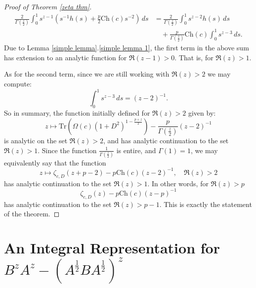\begin{proof}[Proof of Theorem \ref{zeta thm}]
\begin{align*}
            \frac{2}{\Gamma\left(\frac{z}{2}\right)}\int_0^1 s^{z-1}(s^{-1}h(s)+\frac{p}{2}\mathrm{Ch}(c)s^{-2})\,ds &= \frac{2}{\Gamma\left(\frac{z}{2}\right)} \int_0^1 s^{z-2}h(s)\,ds\\
                                                                                                             &\quad + \frac{p}{\Gamma\left(\frac{z}{2}\right)}\mathrm{Ch}(c)\int_0^1 s^{z-3}\,ds.
        \end{align*}
        Due to Lemma \ref{simple lemma}.\eqref{simple lemma 1}, the first term in the above sum has extension to an analytic function for $\Re(z-1) > 0$. That is, for $\Re(z) > 1$. 
        
        As for the second term, since we are still working with $\Re(z) > 2$ we may compute:
        \begin{equation*}
            \int_0^1 s^{z-3}\,ds = (z-2)^{-1}.
        \end{equation*}
        So in summary, the function initially defined for $\Re(z) > 2$ given by:
        \begin{equation*}
            z\mapsto \mathrm{Tr}(\Omega(c)(1+D^2)^{1-\frac{p+z}{2}}) - \frac{p}{\Gamma\left(\frac{z}{2}\right)}(z-2)^{-1}
        \end{equation*}
        is analytic on the set $\Re(z) > 2$, and has analytic continuation to the set $\Re(z) > 1$. Since the function $\frac{1}{\Gamma\left(\frac{z}{2}\right)}$ is entire, and $\Gamma(1) = 1$, we may equivalently say that
        the function
        \begin{equation*}
            z\mapsto \zeta_{c,D}(z+p-2) - p\mathrm{Ch}(c)(z-2)^{-1},\quad \Re(z) > 2
        \end{equation*}
        has analytic continuation to the set $\Re(z) > 1$.
        In other words, for $\Re(z) > p$
        \begin{equation*}
            \zeta_{c,D}(z) - p\mathrm{Ch}(c)(z-p)^{-1}
        \end{equation*}
        has analytic continuation to the set $\Re(z) > p-1$. This is exactly the statement of the theorem.
    \end{proof}


\section[Integral representation]{An Integral Representation for $B^zA^z-(A^{\frac12}BA^{\frac12})^z$}\label{representation section}

